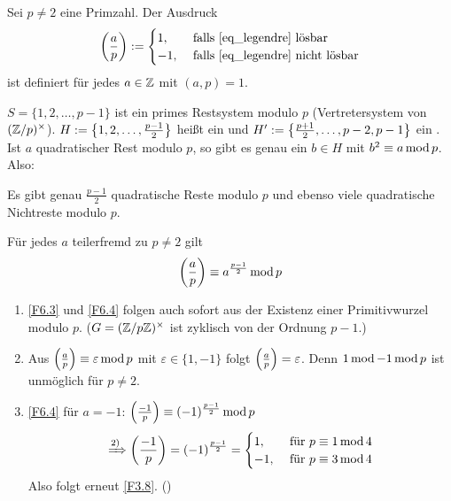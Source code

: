 \begin{defn}[Legendresymbol]
	Sei $p \neq 2$ eine Primzahl. Der Ausdruck
	\begin{equation}
		\leg{a}{p} := \begin{cases}
			1, & \text{ falls \eqref{eq_legendre} lösbar} \\
			-1, & \text{ falls \eqref{eq_legendre} nicht lösbar} \\
		\end{cases}
	\end{equation}
	ist definiert für jedes $a \in \ZZ$ mit $(a,p) = 1$. 
\end{defn}

$S = \{ 1,2,\dots,p-1\}$ ist ein primes Restsystem modulo $p$ (Vertretersystem von $(\ZZ/p)^\times$). $H := \penbrace*{1, 2, \dots, \frac{p-1}{2}}$ heißt ein  und $H' := \penbrace*{ \frac{p+1}{2}, \dots, p-2, p-1 }$ ein . Ist $a$ quadratischer Rest modulo $p$, so gibt es genau ein $b \in H$ mit $b^2 \kon a \modu p$. Also:

\begin{falko} \label{F6.3}
	Es gibt genau $\frac{p-1}{2}$ quadratische Reste modulo $p$ und ebenso viele quadratische Nichtreste modulo $p$.
\end{falko}

\begin{falko} \label{F6.4}
	Für jedes $a$ teilerfremd zu $p \neq 2$ gilt
	\[ \leg{a}{p} \kon a^{\frac{p-1}{2}} \modu p \]
\end{falko}

	\begin{enumerate}[1)]
		\item \ref{F6.3} und \ref{F6.4} folgen auch sofort aus der Existenz einer Primitivwurzel modulo $p$. ($G = (\ZZ/p\ZZ)^\times$ ist zyklisch von der Ordnung $p-1$.)
		\item Aus $\leg{a}{p} \kon \varepsilon \modu p$ mit $\varepsilon \in \{1,-1\}$ folgt $\leg{a}{p} = \varepsilon$. Denn $1 \modu -1 \modu p$ ist unmöglich für $p \neq 2$.
		\item \ref{F6.4} für $a = -1$: $\leg{-1}{p} \kon (-1)^\frac{p-1}{2} \modu p$
		\begin{equation}
			\xRightarrow{\text{2)}} \leg{-1}{p} = (-1)^\frac{p-1}{2} = \begin{cases}
				1, & \text{ für } p \kon 1 \modu 4 \\
				-1, & \text{ für } p \kon 3 \modu 4
			\end{cases} \label{eq_F6.4}
		\end{equation}
		Also folgt erneut \ref{F3.8}. ()
	\end{enumerate}
	
